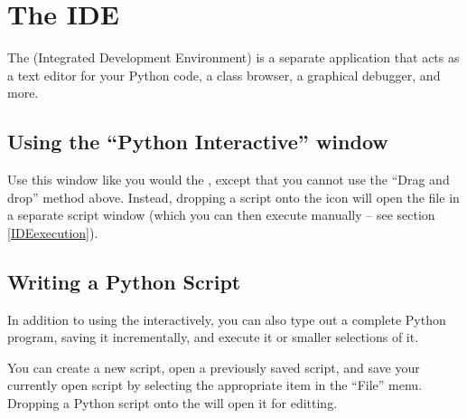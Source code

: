 
 

\section{The IDE\label{IDE}}

The  (Integrated Development Environment) is a
separate application that acts as a text editor for your Python code,
a class browser, a graphical debugger, and more.


\subsection{Using the ``Python Interactive'' window}

Use this window like you would the , except
that you cannot use the ``Drag and drop'' method above. Instead,
dropping a script onto the  icon will open the
file in a separate script window (which you can then execute manually
-- see section \ref{IDEexecution}).


\subsection{Writing a Python Script \label{IDEwrite}}

In addition to using the  interactively, you can
also type out a complete Python program, saving it incrementally, and
execute it or smaller selections of it.

You can create a new script, open a previously saved script, and save
your currently open script by selecting the appropriate item in the
``File'' menu. Dropping a Python script onto the
 will open it for editting.

